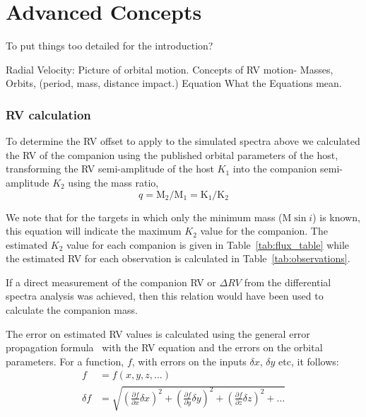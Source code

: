 
\chapter{Advanced Concepts}
\label{cha:concepts}
To put things too detailed for the introduction?


Radial Velocity:
Picture of orbital motion.
Concepts of RV motion-
Masses,
Orbits, (period, mass, distance impact.)
Equation
What the Equations mean.

\subsection{RV calculation}
To determine the RV offset to apply to the simulated spectra above we calculated the RV of the companion using the published orbital parameters of the host, transforming the RV semi-amplitude of the host \(K_{1}\) into the companion semi-amplitude \(K_{2}\) using the mass ratio,
\begin{equation}
\label{eqn:mass_ratio}
q = \textrm{M}_{2} / \textrm{M}_{1} = \textrm{K}_{1} / \textrm{K}_{2}
\end{equation}

We note that for the targets in which only the minimum mass (\(\textrm{M}\sin{i}\)) is known, this equation will indicate the maximum \(K_2\) value for the companion. The estimated \(K_2\) value for each companion is given in Table~\ref{tab:flux_table} while the estimated RV for each observation is calculated in Table~\ref{tab:observations}.

If a direct measurement of the companion RV or \(\Delta RV\) from the differential spectra analysis was achieved, then this relation would have been used to calculate the companion mass.

The error on estimated RV values is calculated using the general error propagation formula~\citep{ku_notes_1966} with the RV equation and the errors on the orbital parameters. For a function, \(f\), with errors on the inputs \(\delta x\), \(\delta y\) etc, it follows:
\begin{align}
f &= f(x, y, z, \ldots)\\
\delta f &= \sqrt{{\left(\frac{\partial f}{\partial x} \delta x\right)}^2 +  {\left(\frac{\partial f}{\partial y} \delta y\right)}^2 + {\left(\frac{\partial f}{\partial z} \delta z\right)}^2 + \ldots}
\end{align}


